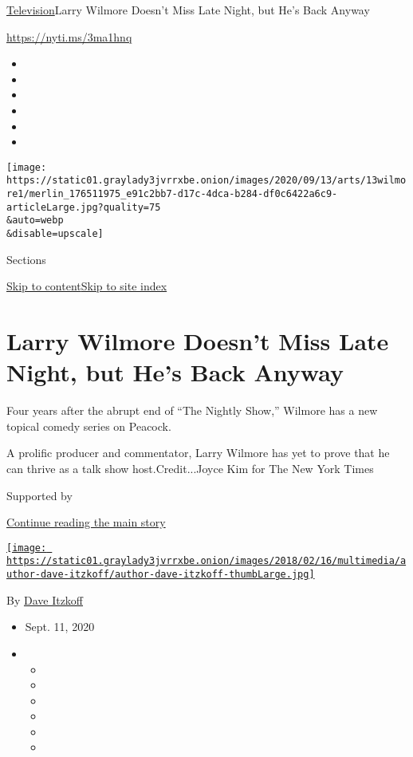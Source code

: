 \href{/section/arts/television}{Television}\textbar{}Larry Wilmore
Doesn't Miss Late Night, but He's Back Anyway

\url{https://nyti.ms/3ma1hnq}

\begin{itemize}
\item
\item
\item
\item
\item
\item
\end{itemize}

\texttt{[image: https://static01.graylady3jvrrxbe.onion/images/2020/09/13/arts/13wilmore1/merlin\_176511975\_e91c2bb7-d17c-4dca-b284-df0c6422a6c9-articleLarge.jpg?quality=75\\\&auto=webp\\\&disable=upscale]}

Sections

\protect\hyperlink{site-content}{Skip to
content}\protect\hyperlink{site-index}{Skip to site index}

\hypertarget{larry-wilmore-doesnt-miss-late-night-but-hes-back-anyway}{%
\section{Larry Wilmore Doesn't Miss Late Night, but He's Back
Anyway}\label{larry-wilmore-doesnt-miss-late-night-but-hes-back-anyway}}

Four years after the abrupt end of ``The Nightly Show,'' Wilmore has a
new topical comedy series on Peacock.

A prolific producer and commentator, Larry Wilmore has yet to prove that
he can thrive as a talk show host.Credit...Joyce Kim for The New York
Times

Supported by

\protect\hyperlink{after-sponsor}{Continue reading the main story}

\href{https://www.nytimes3xbfgragh.onion/by/dave-itzkoff}{\texttt{[image: https://static01.graylady3jvrrxbe.onion/images/2018/02/16/multimedia/author-dave-itzkoff/author-dave-itzkoff-thumbLarge.jpg]}}

By \href{https://www.nytimes3xbfgragh.onion/by/dave-itzkoff}{Dave
Itzkoff}

\begin{itemize}
\item
  Sept. 11, 2020
\item
  \begin{itemize}
  \item
  \item
  \item
  \item
  \item
  \item
  \end{itemize}
\end{itemize}

